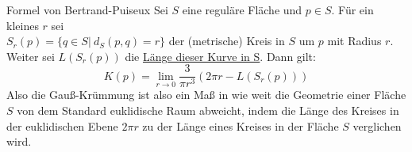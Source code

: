 \begin{titleDef}{Formel von Bertrand-Puiseux}
\label{bertrandpuiseux}
Sei $S$ eine reguläre Fläche und $p\in S$. Für ein kleines $r$ sei \\
$S_r(p)=\{q\in S|\ d_S(p,q)=r\}$ der (metrische) Kreis in $S$ um $p$ mit Radius $r$. Weiter sei $L(S_r(p))$ die \hyperref[laengeFlaechenkurve]{Länge dieser Kurve in S}. Dann gilt:
$$K(p)=\lim_{r\to 0}\frac{3}{\pi r^3}(2\pi r-L(S_r(p)))$$
Also die Gauß-Krümmung ist also ein Maß in wie weit die Geometrie einer Fläche $S$ von dem Standard euklidische Raum abweicht, indem die Länge des Kreises in der euklidischen Ebene $2\pi r$ zu der Länge eines Kreises in der Fläche $S$ verglichen wird.

\end{titleDef}
